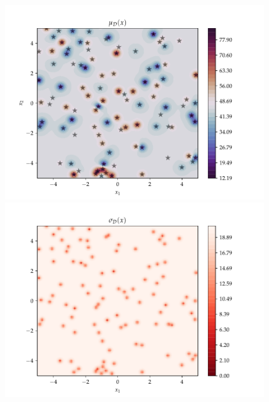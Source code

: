 \begin{figure}[h]
   \begin{minipage}[b]{0.49\textwidth}
    \includegraphics[trim=1.2cm 0.7cm 2cm 1cm,clip,width=\textwidth]{Figures/coco_reg/f23_Gaussian Process - sklearn2.pdf}
   \end{minipage}
   \hfill
   \begin{minipage}[b]{0.49\textwidth}
     \includegraphics[trim=1.2cm 0.7cm 2cm 1cm,clip,width=\textwidth]{Figures/coco_reg/f23_Gaussian Process - sklearn3.pdf}
    \end{minipage}


\end{figure}
